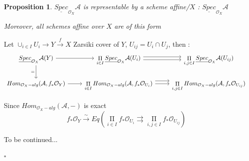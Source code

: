 \documentclass{article}
\newtheorem{proposition}[theorem]{Proposition}
\newenvironment{Proof}{{\noindent \indent \it Proof:\quad}}{\hfill $\square$\par}
\begin{document}
\begin{proposition}

$\underline{Spec}_{\mathcal O_X}\mathcal A$ is representable by a  scheme affine/$X$ : $\underline{Spec}_{\mathcal O_X}\mathcal A$

    Moreover, all schemes affine over $X$ are of this form
\end{proposition}
\begin{Proof}

Let $\cup_{i\in I}U_i\to Y\xrightarrow{f} X$ Zarsiki cover of $Y$, $U_{ij}=U_i\cap U_j$, then :
\[\begin{tikzcd}
	{\underline{Spec}_{\mathcal O_X}\mathcal A(Y)} & {\mathop{\Pi}\limits_{i\in I}\underline{Spec}_{\mathcal O_X}\mathcal A(U_i)} & {\mathop{\Pi}\limits_{i,j\in I}\underline{Spec}_{\mathcal O_X}\mathcal A(U_{ij})} \\
	{Hom_{\mathcal O_X-alg}(\mathcal A,f_\ast\mathcal O_Y)} & {\mathop{\Pi}\limits_{i\in I}Hom_{\mathcal O_X-alg}(\mathcal A,f_\ast\mathcal O_{U_i})} & {\mathop{\Pi}\limits_{i,j\in I}Hom_{\mathcal O_X-alg}(\mathcal A,f_\ast\mathcal O_{U_{ij}})}
	\arrow[from=1-1, to=1-2]
	\arrow[shift right, from=1-2, to=1-3]
	\arrow[shift left, from=1-2, to=1-3]
	\arrow[from=2-2, to=2-3]
	\arrow[from=2-1, to=2-2]
	\arrow[shift left=2, from=2-2, to=2-3]
	\arrow["{=}"', from=1-1, to=2-1]
\end{tikzcd}\]

Since $Hom_{\mathcal O_X-alg}(\mathcal A,-)$ is exact
$$
f_\ast\mathcal O_Y\xrightarrow{\sim} 
Eq(
\mathop{\Pi}\limits_{i\in I}f_\ast\mathcal O_{U_i}
\rightrightarrows
\mathop{\Pi}\limits_{i,j\in I}f_\ast\mathcal O_{U_{ij}}
)
$$

To be continued...

\end{Proof}
\end{document}
